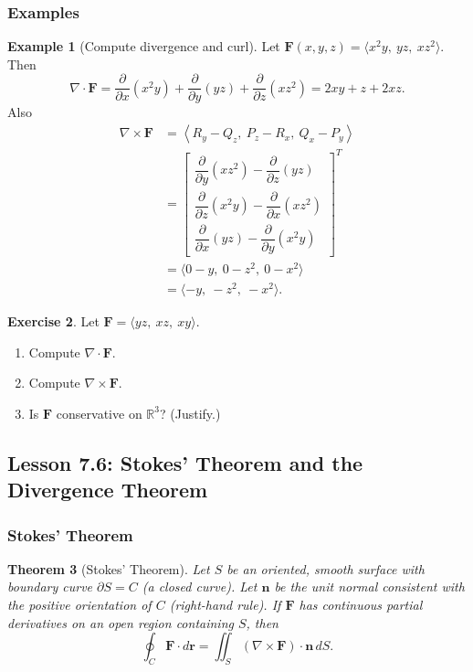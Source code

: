 \documentclass[12pt]{article}
\numberwithin{equation}{section}
\newcommand{\RR}{\mathbb{R}}
\newcommand{\vect}[1]{\boldsymbol{#1}}   %
\theoremstyle{plain}
\newtheorem{theorem}{Theorem}[section]
\theoremstyle{definition}
\newtheorem{example}[theorem]{Example}
\newtheorem{exercise}[theorem]{Exercise}
\theoremstyle{remark}
\begin{document}
\subsubsection{Examples}

\begin{example}[Compute divergence and curl]
Let $\vect F(x,y,z)=\langle x^2y,\ yz,\ xz^2\rangle$.
Then
\[
\nabla\cdot \vect F
=\frac{\partial}{\partial x}(x^2y)+\frac{\partial}{\partial y}(yz)+\frac{\partial}{\partial z}(xz^2)
=2xy+z+2xz.
\]
Also
\begin{align*}
\nabla\times \vect F
&= \left\langle R_y-Q_z,\ P_z-R_x,\ Q_x-P_y \right\rangle \\[8pt]
&= \begin{bmatrix}
\dfrac{\partial}{\partial y}(xz^2)-\dfrac{\partial}{\partial z}(yz) \\[8pt]
\dfrac{\partial}{\partial z}(x^2y)-\dfrac{\partial}{\partial x}(xz^2) \\[8pt]
\dfrac{\partial}{\partial x}(yz)-\dfrac{\partial}{\partial y}(x^2y)
\end{bmatrix}^T \\[8pt]
&= \langle 0-y,\ 0-z^2,\ 0-x^2 \rangle \\[5pt]
&= \langle -y,\ -z^2,\ -x^2\rangle.
\end{align*}
\end{example}

\begin{exercise}
Let $\vect F=\langle yz,\ xz,\ xy\rangle$.
\begin{enumerate}[label=(\alph*)]
\item Compute $\nabla\cdot \vect F$.
\item Compute $\nabla\times \vect F$.
\item Is $\vect F$ conservative on $\RR^3$? (Justify.)
\end{enumerate}
\end{exercise}

\subsection{Lesson 7.6: Stokes' Theorem and the Divergence Theorem}

\subsubsection{Stokes' Theorem}

\begin{theorem}[Stokes' Theorem]\label{thm:stokes}
Let $S$ be an oriented, smooth surface with boundary curve $\partial S=C$ (a closed curve).
Let $\vect n$ be the unit normal consistent with the positive orientation of $C$ (right-hand rule).
If $\vect F$ has continuous partial derivatives on an open region containing $S$, then
\begin{equation}\label{eq:stokes}
\oint_{C} \vect F\cdot d\vect r
=
\iint_{S} (\nabla\times \vect F)\cdot \vect n\,dS.
\end{equation}
\end{theorem}
\end{document}
